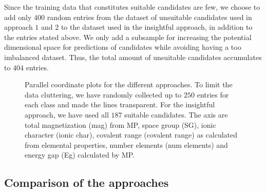 Since the training data that constitutes suitable candidates are few, we choose to add only $400$ random entries from the dataset of unsuitable candidates used in approach $1$ and $2$ to the dataset used in the insightful approach, in addition to the entries stated above. We only add a subsample for increasing the potential dimensional space for predictions of candidates while avoiding having a too imbalanced dataset. Thus, the total amount of unsuitable candidates accumulates to $404$ entries.

\begin{figure}[ht!]
    \centering
    \begin{subfigure}{1\textwidth}
        \centering
          
    \end{subfigure}
    \begin{subfigure}{1\textwidth}
        \centering
          
    \end{subfigure}
    \begin{subfigure}{1\textwidth}
        \centering
          
    \end{subfigure}
    \vspace*{-95mm}
    \caption{Parallel coordinate plots for the different approaches. To limit the data cluttering, we have randomly collected up to $250$ entries for each class and made the lines transparent. For the insightful approach, we have used all $187$ suitable candidates. The axis are total magnetization (mag) from MP, space group (SG), ionic character (ionic char), covalent range (covalent range) as calculated from elemental properties, number elements (num elements) and energy gap (Eg) calculated by MP.}
    \label{fig:parallel-coordinates-approaches}
\end{figure}

\clearpage


\subsection{Comparison of the approaches}

